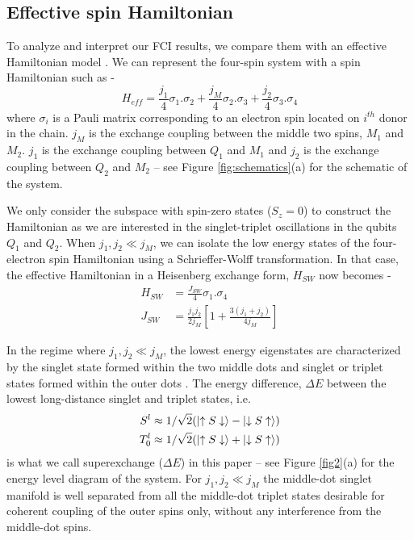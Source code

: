 \documentclass[%
showkeys,
 amsmath,amssymb,
 aps,
prb,
]{revtex4-2}
\begin{document}
\subsection{Effective spin Hamiltonian}
To analyze and interpret our FCI results, we compare them with an effective Hamiltonian model \cite{qiao_long-distance_2021}. We can represent the four-spin system with a spin Hamiltonian such as - 
\begin{equation}
    H_{eff} = \frac{j_1}{4} \sigma_1 . \sigma_2 + \frac{j_M}{4} \sigma_2 . \sigma_3 + \frac{j_2}{4} \sigma_3 . \sigma_4 
    \label{Heff}
\end{equation}
where $\sigma_i$ is a Pauli matrix corresponding to an electron spin located on $i^{th}$ donor in the chain. $j_M$ is the exchange coupling between the middle two spins, $M_1$ and $M_2$. $j_1$ is the exchange coupling between $Q_1$ and $M_1$ and $j_2$ is the exchange coupling between $Q_2$ and $M_2$ -- see Figure \ref{fig:schematics}(a) for the schematic of the system. 

We only consider the subspace with spin-zero states ($S_z = 0$) to construct the Hamiltonian as we are interested in the singlet-triplet oscillations in the qubits $Q_1$ and $Q_2$. When $j_1,j_2 \ll j_M$, we can isolate the low energy states of the four-electron spin Hamiltonian using a Schrieffer-Wolff transformation. In that case, the effective Hamiltonian in a Heisenberg exchange form, $H_{SW}$ \cite{qiao_long-distance_2021} now becomes - 
\begin{equation}
\begin{split}
    H_{SW} & = \frac{J_{SW}}{4} \sigma_1 . \sigma_4 \\
    J_{SW} & = \frac{j_1j_2}{2j_M} [1+\frac{3(j_1+j_2)}{4j_M}]
\end{split}
\label{HSW}
\end{equation}

In the regime where $j_1, j_2 \ll  j_M$, the lowest energy eigenstates are characterized by the singlet state formed within the two middle dots and singlet or triplet states formed within the outer dots \cite{qiao_long-distance_2021}. The energy difference, $\Delta E$ between the lowest long-distance singlet and triplet states, i.e.
\begin{equation}
\begin{split}
    S^l \approx 1/\sqrt{2}(\ket{\uparrow S \downarrow} -  \ket{\downarrow S \uparrow}) \\
    T^l_0 \approx 1/\sqrt{2}(\ket{\uparrow S \downarrow} +  \ket{\downarrow S \uparrow})
\end{split}
\end{equation}
is what we call superexchange ($\Delta E$) in this paper -- see Figure \ref{fig2}(a) for the energy level diagram of the system. For $j_1, j_2 \ll  j_M$ the middle-dot singlet manifold is well separated from all the middle-dot triplet states desirable for coherent coupling of the outer spins only, without any interference from the middle-dot spins.
\end{document}
